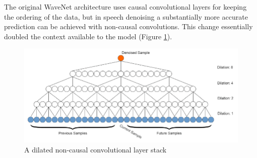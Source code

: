 \documentclass{article}
\begin{document}
	The original WaveNet architecture uses causal convolutional layers for keeping the ordering of the data, but in speech denoising a substantially more accurate prediction can be achieved with non-causal convolutions. This change essentially doubled the context available to the model (Figure \ref{fig:dnccs}).
	
	
	\begin{figure}[H]
		\centering
		\includegraphics[width=.9\linewidth]{dnccs.png}
		\caption{A dilated non-causal convolutional layer stack}
		\label{fig:dnccs}
	\end{figure}
	
	
\end{document}
